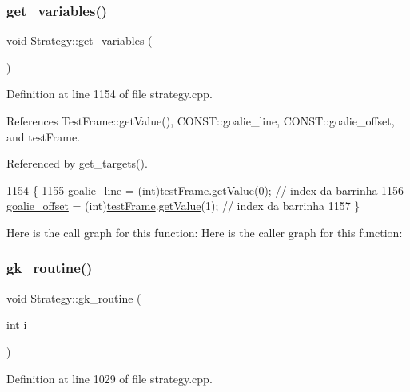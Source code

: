 \subsubsection{\texorpdfstring{get\+\_\+variables()}{get\_variables()}}
{\footnotesize\ttfamily void Strategy\+::get\+\_\+variables (\begin{DoxyParamCaption}{ }\end{DoxyParamCaption})}



Definition at line 1154 of file strategy.\+cpp.



References Test\+Frame\+::get\+Value(), C\+O\+N\+S\+T\+::goalie\+\_\+line, C\+O\+N\+S\+T\+::goalie\+\_\+offset, and test\+Frame.



Referenced by get\+\_\+targets().


\begin{DoxyCode}
1154                              \{
1155     \hyperlink{namespace_c_o_n_s_t_a0091cb614eeaed41acd8997e9f9c9c0c}{goalie\_line} = (int)\hyperlink{class_strategy_a6fabfc409deb567f30bae2150cfbafad}{testFrame}.\hyperlink{class_test_frame_aeb75046b3b4be4c4dbc43d233e967a08}{getValue}(0); \textcolor{comment}{// index da barrinha}
1156     \hyperlink{namespace_c_o_n_s_t_a75c38666c7edbca23d10a3fc651865a4}{goalie\_offset} = (int)\hyperlink{class_strategy_a6fabfc409deb567f30bae2150cfbafad}{testFrame}.\hyperlink{class_test_frame_aeb75046b3b4be4c4dbc43d233e967a08}{getValue}(1); \textcolor{comment}{// index da barrinha}
1157 \}
\end{DoxyCode}
Here is the call graph for this function\+:
Here is the caller graph for this function\+:
\mbox{\label{class_strategy_a0e93b877f1da0c7a608c5641812f54d4}} 
\subsubsection{\texorpdfstring{gk\+\_\+routine()}{gk\_routine()}}
{\footnotesize\ttfamily void Strategy\+::gk\+\_\+routine (\begin{DoxyParamCaption}\item[{int}]{i }\end{DoxyParamCaption})}



Definition at line 1029 of file strategy.\+cpp.



